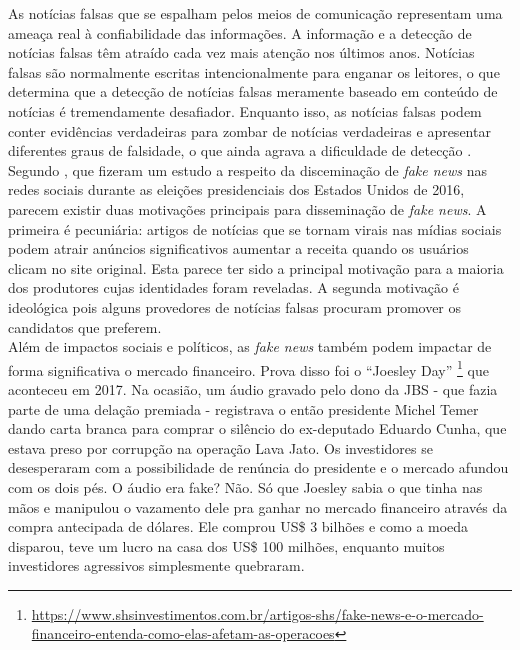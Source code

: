 

As notícias falsas que se espalham pelos meios de comunicação representam uma ameaça real à confiabilidade das informações.
A informação e a detecção de notícias falsas têm atraído cada vez mais atenção nos últimos anos. Notícias falsas
são normalmente escritas intencionalmente para enganar os leitores, o que determina que a detecção de notícias falsas
meramente baseado em conteúdo de notícias é tremendamente desafiador. Enquanto isso, as notícias falsas podem
conter evidências verdadeiras para zombar de notícias verdadeiras e apresentar diferentes graus de falsidade, o que ainda
agrava a dificuldade de detecção \cite{karimi2018}. \\

Segundo \cite{allcot2017}, que fizeram um estudo a respeito da disceminação de \textit{fake news} nas redes sociais durante as eleições presidenciais dos Estados Unidos de 2016, parecem existir duas motivações principais para disseminação de \textit{fake news}. A primeira é pecuniária: artigos de notícias que se tornam virais nas mídias sociais podem atrair anúncios significativos aumentar a receita quando os usuários clicam no site original. 
Esta parece ter sido a principal motivação para a maioria dos produtores cujas identidades foram reveladas. 
A segunda motivação é ideológica pois alguns provedores de notícias falsas procuram promover os candidatos que preferem. \\

Além de impactos sociais e políticos, as \textit{fake news} também podem impactar de forma significativa o mercado financeiro. Prova disso foi o ``Joesley Day'' \footnote{\url{https://www.shsinvestimentos.com.br/artigos-shs/fake-news-e-o-mercado-financeiro-entenda-como-elas-afetam-as-operacoes}} que aconteceu em 2017. Na ocasião, um áudio gravado pelo dono da JBS - que fazia parte de uma delação premiada - registrava o então presidente Michel Temer dando carta branca para comprar o silêncio do ex-deputado Eduardo Cunha, que estava preso por corrupção na operação Lava Jato. Os investidores se desesperaram com a possibilidade de renúncia do presidente e o mercado afundou com os dois pés. O áudio era fake? Não. Só que Joesley sabia o que tinha nas mãos e manipulou o vazamento dele pra ganhar no mercado financeiro através da compra antecipada de dólares. Ele comprou US\$ 3 bilhões e como a moeda disparou, teve um lucro na casa dos US\$ 100 milhões, enquanto muitos investidores agressivos simplesmente quebraram.

